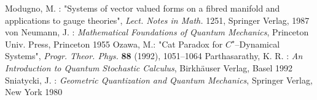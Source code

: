 \documentclass[12pt]{article}
\begin{document}
\begin{thebibliography}{99}
 Modugno,  M. : "Systems of vector valued forms on
a fibred manifold and applications to gauge theories", 
{\sl Lect.  Notes in Math. } 1251,  Springer Verlag,  1987
 von Neumann,  J. : {\sl Mathematical Foundations of
Quantum Mechanics},  Princeton Univ.  Press,  Princeton 1955
 Ozawa, M.: "Cat Paradox for $C^{\star}$--Dynamical
Systems", {\sl Progr. Theor. Phys. }{\bf 88} (1992), 1051--1064
  Parthasarathy,  K. R. : {\sl An
Introduction to Quantum Stochastic Calculus},  Birkh\"auser Verlag, 
Basel 1992 
 Sniatycki,  J. : {\sl Geometric Quantization and Quantum
Mechanics},  Springer Verlag,  New York 1980

\end{thebibliography}
\end{document}
